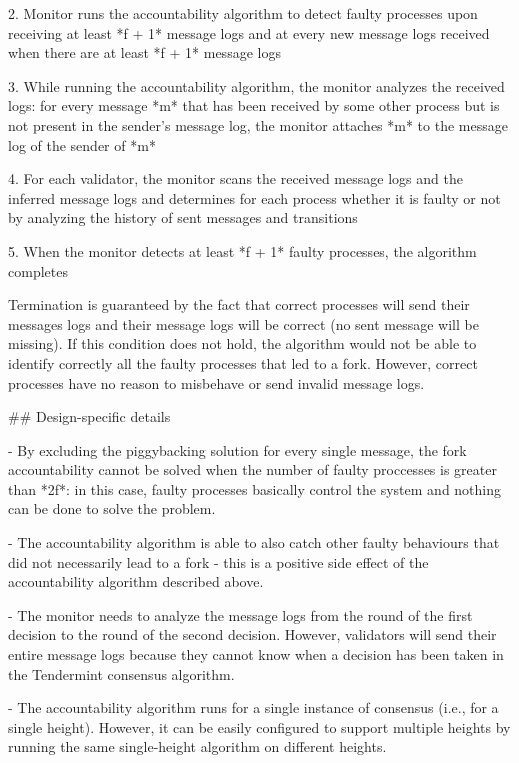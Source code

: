 \documentclass[a4paper,11pt,oneside]{report}
\begin{document}
\begin{markdown}
2. Monitor runs the accountability algorithm to detect faulty processes upon receiving at least *f + 1* message logs and at every new message logs received when there are at least *f + 1* message logs 

3. While running the accountability algorithm, the monitor analyzes the received logs: for every message *m* that has been received by some other process but is not present in the sender's message log, the monitor attaches *m* to the message log of the sender of *m*

4. For each validator, the monitor scans the received message logs and the inferred message logs and determines for each process whether it is faulty or not by analyzing the history of sent messages and transitions

5. When the monitor detects at least *f + 1* faulty processes, the algorithm completes

Termination is guaranteed by the fact that correct processes will send their messages logs and their message logs will be correct (no sent message will be missing). 
If this condition does not hold, the algorithm would not be able to identify correctly all the faulty processes that led to a fork. However, correct processes have no reason to misbehave or send invalid message logs. 

## Design-specific details

- By excluding the piggybacking solution for every single message, the fork accountability cannot be solved when the number of faulty proccesses is greater than *2f*: in this case, faulty processes basically control the system and nothing can be done to solve the problem.

- The accountability algorithm is able to also catch other faulty behaviours that did not necessarily lead to a fork - this is a positive side effect of the accountability algorithm described above.

- The monitor needs to analyze the message logs from the round of the first decision to the round of the second decision. However, validators will send their entire message logs because they cannot know when a decision has been taken in the Tendermint consensus algorithm. 

- The accountability algorithm runs for a single instance of consensus (i.e., for a single height). However, it can be easily configured to support multiple heights by running the same single-height algorithm on different heights. 

\end{markdown}
\end{document}
